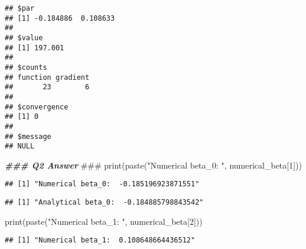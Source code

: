 \documentclass[
]{article}
\newenvironment{Shaded}{\begin{snugshade}}{\end{snugshade}}
\newcommand{\AlertTok}[1]{\textcolor[rgb]{0.94,0.16,0.16}{#1}}
\newcommand{\DecValTok}[1]{\textcolor[rgb]{0.00,0.00,0.81}{#1}}
\newcommand{\DocumentationTok}[1]{\textcolor[rgb]{0.56,0.35,0.01}{\textbf{\textit{#1}}}}
\newcommand{\FunctionTok}[1]{\textcolor[rgb]{0.00,0.00,0.00}{#1}}
\newcommand{\NormalTok}[1]{#1}
\newcommand{\SpecialCharTok}[1]{\textcolor[rgb]{0.00,0.00,0.00}{#1}}
\newcommand{\StringTok}[1]{\textcolor[rgb]{0.31,0.60,0.02}{#1}}
\begin{document}
\begin{verbatim}
## $par
## [1] -0.184886  0.108633
## 
## $value
## [1] 197.001
## 
## $counts
## function gradient 
##       23        6 
## 
## $convergence
## [1] 0
## 
## $message
## NULL
\end{verbatim}

\begin{Shaded}
\begin{Highlighting}[]
\DocumentationTok{\#\#\# Q2 Answer }\AlertTok{\#\#\#}
\FunctionTok{print}\NormalTok{(}\FunctionTok{paste}\NormalTok{(}\StringTok{"Numerical beta\_0: "}\NormalTok{, numerical\_beta[}\DecValTok{1}\NormalTok{]))}
\end{Highlighting}
\end{Shaded}

\begin{verbatim}
## [1] "Numerical beta_0:  -0.185196923871551"
\end{verbatim}

\begin{Shaded}
\end{Shaded}

\begin{verbatim}
## [1] "Analytical beta_0:  -0.184885798843542"
\end{verbatim}

\begin{Shaded}
\begin{Highlighting}[]
\FunctionTok{print}\NormalTok{(}\FunctionTok{paste}\NormalTok{(}\StringTok{"Numerical beta\_1: "}\NormalTok{, numerical\_beta[}\DecValTok{2}\NormalTok{]))}
\end{Highlighting}
\end{Shaded}

\begin{verbatim}
## [1] "Numerical beta_1:  0.108648664436512"
\end{verbatim}

\begin{Shaded}
\end{Shaded}
\end{document}
